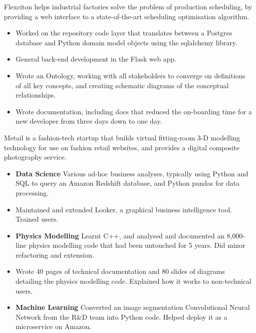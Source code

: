 \documentclass[11pt,a4paper,sans]{moderncv} %
\begin{document}
\vspace{0.2em}

{Flexciton helps industrial factories solve the problem of production scheduling, by providing a web interface to a state-of-the-art scheduling optimisation algorithm.
\begin{itemize}
	\item Worked on the repository code layer that translates between a Postgres database and Python domain model objects using the sqlalchemy library.
	\item General back-end development in the Flask web app.
	\item Wrote an Ontology, working with all stakeholders to converge on definitions of all key concepts, and creating schematic diagrams of the conceptual relationships.
	\item Wrote documentation, including docs that reduced the on-boarding time for a new developer from three days down to one day.
\end{itemize}}

{Metail is a fashion-tech startup that builds virtual fitting-room 3-D modelling technology for use on fashion retail websites, and provides a digital composite photography service.
	\begin{itemize}
		\item \textbf{Data Science} Various ad-hoc business analyses, typically using Python and SQL to query an Amazon Redshift database, and Python pandas for data processing.
		\item Maintained and extended Looker, a graphical business intelligence tool. Trained users.
		\item \textbf{Physics Modelling} Learnt C++, and analysed and documented an 8,000-line physics modelling code that had been untouched for 5 years. Did minor refactoring and extension.
		\item Wrote 40 pages of technical documentation and 80 slides of diagrams detailing the physics modelling code. Explained how it works to non-technical users.
		\item \textbf{Machine Learning} Converted an image segmentation Convolutional Neural Network from the R\&D team into Python code.  Helped deploy it as a microservice on Amazon.
	\end{itemize}
}
\end{document}
